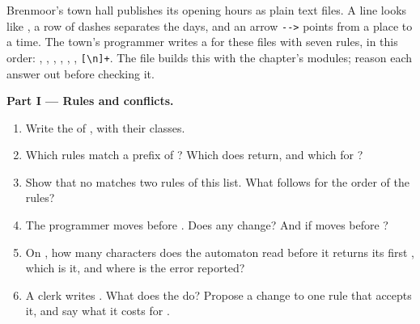 \begin{problem}\label{pb:b3:lexical-analysis:1}
Brenmoor's town hall publishes its opening hours as plain text files. A line looks like , a row of dashes separates the days, and an arrow \texttt{-{}-{}>} points from a place to a time. The town's programmer writes a  for these files with seven rules, in this order:
 \code{[0-9][0-9]:[0-9][0-9]},  \code{[0-9]+},  \code{[A-Z][a-z]*},  \code{[a-z]+},  \code{-+>},  \code{-},  \texttt{[\textvisiblespace\textbackslash n]+}.
The file  builds this  with the chapter's modules; reason each answer out before checking it.

\medskip\noindent\textbf{Part I --- Rules and conflicts.}
\begin{enumerate}
\item Write the  of , with their classes.
\item Which rules match a prefix of ? Which  does  return, and which for ?
\item Show that no  matches two rules of this list. What follows for the order of the rules?
\item The programmer moves  before . Does any  change? And if  moves before ?
\item On , how many characters does the automaton read before it returns its first , which  is it, and where is the error reported?
\item A clerk writes . What does the  do? Propose a change to one rule that accepts it, and say what it costs for .
\end{enumerate}


\end{problem}
